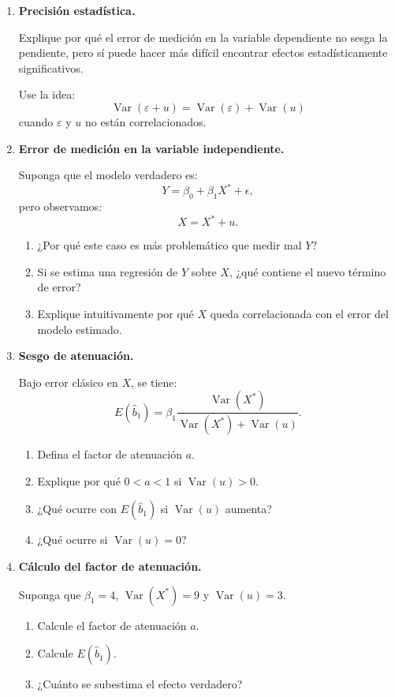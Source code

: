 \documentclass[11pt]{article}
\begin{document}
\begin{enumerate}[label=\textbf{Ejercicio \arabic*.}, leftmargin=*]
\item \textbf{Precisión estadística.}

Explique por qué el error de medición en la variable dependiente no sesga la pendiente, pero sí puede hacer más difícil encontrar efectos estadísticamente significativos.

Use la idea:
\[
\operatorname{Var}(\varepsilon+u)=\operatorname{Var}(\varepsilon)+\operatorname{Var}(u)
\]
cuando $\varepsilon$ y $u$ no están correlacionados.

\item \textbf{Error de medición en la variable independiente.}

Suponga que el modelo verdadero es:
\[
Y=\beta_0+\beta_1X^*+\epsilon,
\]
pero observamos:
\[
X=X^*+u.
\]

\begin{enumerate}[label=\alph*)]
    \item ¿Por qué este caso es más problemático que medir mal $Y$?
    \item Si se estima una regresión de $Y$ sobre $X$, ¿qué contiene el nuevo término de error?
    \item Explique intuitivamente por qué $X$ queda correlacionada con el error del modelo estimado.
\end{enumerate}

\item \textbf{Sesgo de atenuación.}

Bajo error clásico en $X$, se tiene:
\[
E(\hat{b}_1)=
\beta_1
\frac{\operatorname{Var}(X^*)}
{\operatorname{Var}(X^*)+\operatorname{Var}(u)}.
\]

\begin{enumerate}[label=\alph*)]
    \item Defina el factor de atenuación $a$.
    \item Explique por qué $0<a<1$ si $\operatorname{Var}(u)>0$.
    \item ¿Qué ocurre con $E(\hat{b}_1)$ si $\operatorname{Var}(u)$ aumenta?
    \item ¿Qué ocurre si $\operatorname{Var}(u)=0$?
\end{enumerate}

\item \textbf{Cálculo del factor de atenuación.}

Suponga que $\beta_1=4$, $\operatorname{Var}(X^*)=9$ y $\operatorname{Var}(u)=3$.

\begin{enumerate}[label=\alph*)]
    \item Calcule el factor de atenuación $a$.
    \item Calcule $E(\hat{b}_1)$.
    \item ¿Cuánto se subestima el efecto verdadero?
\end{enumerate}


\end{enumerate}
\end{document}
